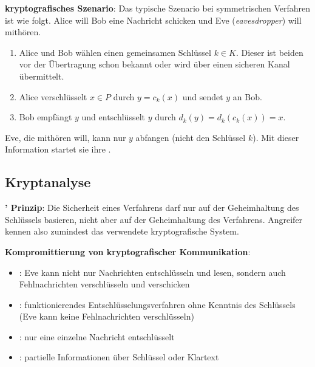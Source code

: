\textbf{kryptografisches Szenario}:
Das typische Szenario bei symmetrischen Verfahren ist wie folgt.
Alice will Bob eine Nachricht schicken und Eve (\emph{eavesdropper}) will mithören.
\begin{enumerate}
    \item
    Alice und Bob wählen einen gemeinsamen Schlüssel $k \in K$.
    Dieser ist beiden vor der Übertragung schon bekannt oder wird über einen
    sicheren Kanal übermittelt.
    
    \item
    Alice verschlüsselt $x \in P$ durch $y = c_k(x)$ und sendet $y$ an Bob.
    
    \item
    Bob empfängt $y$ und entschlüsselt $y$ durch $d_k(y) = d_k(c_k(x)) = x$.
\end{enumerate}
Eve, die mithören will, kann nur $y$ abfangen (nicht den Schlüssel $k$).
Mit dieser Information startet sie ihre .

\pagebreak

\subsection{%
    Kryptanalyse%
}

\textbf{' Prinzip}:
Die Sicherheit eines Verfahrens darf nur auf der Geheimhaltung des Schlüssels basieren,
nicht aber auf der Geheimhaltung des Verfahrens.
Angreifer kennen also zumindest das verwendete kryptografische System.

\linie

\textbf{Kompromittierung von kryptografischer Kommunikation}:
\begin{itemize}
    \item
    :
    Eve kann nicht nur Nachrichten entschlüsseln und lesen, sondern auch
    Fehlnachrichten verschlüsseln und verschicken
    
    \item
    :
    funktionierendes Entschlüsselungsverfahren ohne Kenntnis des Schlüssels\\
    (Eve kann keine Fehlnachrichten verschlüsseln)
    
    \item
    :
    nur eine einzelne Nachricht entschlüsselt
    
    \item
    :
    partielle Informationen über Schlüssel oder Klartext
\end{itemize}

